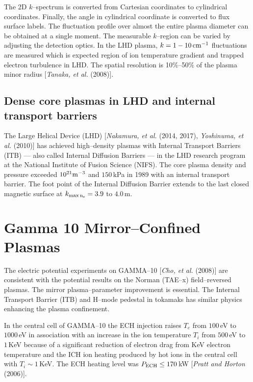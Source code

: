 \documentclass[a4paper,openany,12pt]{report}
\begin{document}
The 2D $k$--spectrum is converted from Cartesian coordinates to cylindrical coordinates. Finally, the angle in cylindrical coordinate is converted to flux surface labels. The fluctuation profile over almost the entire plasma diameter can be obtained at a single moment. The measurable $k$--region can be varied by adjusting the detection optics. In the LHD plasma, $k=1-10\,\rm cm^{-1}$ fluctuations are measured which is expected region of ion temperature gradient and trapped electron turbulence in LHD. The spatial resolution is 10\%--50\% of the plasma minor radius [\emph{Tanaka, et al.} (2008)].

\subsection{Dense core plasmas in LHD and internal transport barriers}

The Large Helical Device (LHD) [\emph{Nakamura, et al.} (2014, 2017), \emph{Yoshinuma, et al.} (2010)] has achieved high--density plasmas with Internal Transport Barriers (ITB) --- also called Internal Diffusion Barriers --- in the LHD research program at the National Institute of Fusion Science (NIFS). The core plasma density and pressure exceeded $10^{21}\rm m^{-3}$ and $150\,$kPa in 1989 with an internal transport barrier. The foot point of the Internal Diffusion Barrier extends to the last closed magnetic surface at $k_{\rm max\, n_e}=3.9$ to $4.0\,$m.


\section{Gamma 10 Mirror--Confined Plasmas}

The electric potential experiments on GAMMA--10 [\emph{Cho, et al.} (2008)] are consistent with the potential results on the Norman (TAE--x) field--reversed plasmas. The mirror plasma--parameter improvement is essential. The Internal Transport Barrier (ITB) and H--mode pedestal in tokamaks has similar physics enhancing the plasma confinement.

In the central cell of GAMMA--10 the ECH injection raises $T_e$ from $100\,$eV to $1000\,$eV in association with an increase in the ion temperature $T_i$ from $500\,$eV to $1\,$KeV because of a significant reduction of electron drag from KeV electron temperature and the ICH ion heating produced by hot ions in the central cell with $T_i\sim 1\,$KeV. The ECH heating level was $P_{\rm ECH}\le 170\,$kW [\emph{Pratt and Horton} (2006)].
\end{document}
